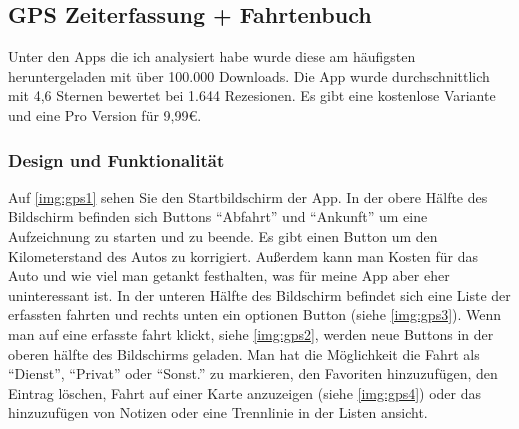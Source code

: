 \documentclass[a4paper]{article}
\begin{document}
\subsection{GPS Zeiterfassung + Fahrtenbuch}
Unter den Apps die ich analysiert habe wurde diese am häufigsten heruntergeladen mit über 100.000 Downloads.
Die App wurde durchschnittlich mit 4,6 Sternen bewertet bei 1.644 Rezesionen. Es gibt eine kostenlose Variante
und eine Pro Version für 9,99€.

\subsubsection{Design und Funktionalität}
Auf \ref{img:gps1} sehen Sie den Startbildschirm der App.
In der obere Hälfte des Bildschirm befinden sich Buttons \enquote{Abfahrt} und \enquote{Ankunft} um eine
Aufzeichnung zu starten und zu beende. Es gibt einen Button um den Kilometerstand des Autos zu korrigiert.
Außerdem kann man Kosten für das Auto und wie viel man getankt festhalten, was für meine App aber eher
uninteressant ist. In der unteren Hälfte des Bildschirm befindet sich eine Liste der erfassten fahrten
und rechts unten ein optionen Button (siehe \ref{img:gps3}). Wenn man auf eine erfasste fahrt klickt, siehe \ref{img:gps2},
werden neue Buttons in der oberen hälfte des Bildschirms geladen. Man hat die Möglichkeit die Fahrt als
\enquote{Dienst}, \enquote{Privat} oder \enquote{Sonst.} zu markieren, den Favoriten hinzuzufügen,
den Eintrag löschen, Fahrt auf einer Karte anzuzeigen (siehe \ref{img:gps4}) oder das hinzuzufügen von Notizen
oder eine Trennlinie in der Listen ansicht.
\end{document}
